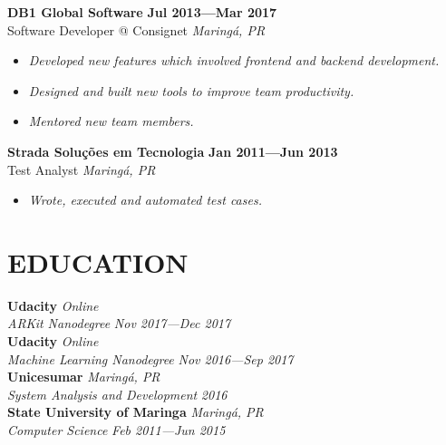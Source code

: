 \documentclass[line,margin]{res}
\begin{document}
\begin{resume}
  {\bf DB1 Global Software} \hfill {\bf Jul 2013---Mar 2017} \\
  Software Developer @ Consignet \hfill {\sl Maring\'a, PR}\\[-6pt]
  \begin{itemize}
    \item {\sl Developed new features which involved
               frontend and backend development.}
    \item {\sl Designed and built new tools to improve team productivity.}
    \item {\sl Mentored new team members.}
  \end{itemize}

  {\bf Strada Solu\c{c}\~oes em Tecnologia} \hfill {\bf Jan 2011---Jun 2013} \\
  Test Analyst \hfill {\sl Maring\'a, PR}\\[-6pt]
    \begin{itemize}
    \item {\sl Wrote, executed and automated test cases.}
  \end{itemize}


\section{EDUCATION}
  {\bf Udacity} \hfill {\sl Online} \\
  {\sl ARKit Nanodegree} \hfill {\sl Nov 2017---Dec 2017}\\[6pt]
  {\bf Udacity} \hfill {\sl Online} \\
  {\sl Machine Learning Nanodegree} \hfill {\sl Nov 2016---Sep 2017}\\[6pt]
  {\bf Unicesumar} \hfill {\sl Maring\'a, PR} \\
  {\sl System Analysis and Development} \hfill {\sl 2016}\\[6pt]
  {\bf State University of Maringa} \hfill {\sl Maring\'a, PR} \\
  {\sl Computer Science} \hfill {\sl Feb 2011---Jun 2015}



\end{resume}
\end{document}
